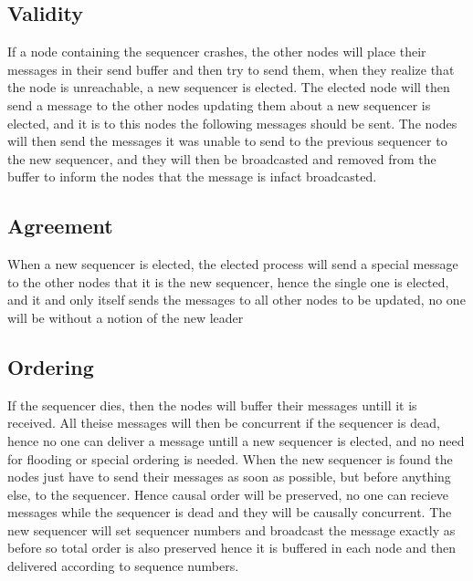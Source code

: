\documentclass{article}
\begin{document}
  \subsection{Validity}
    If a node containing the sequencer crashes, the other nodes will place their messages in their
    send buffer and then try to send them, when they realize that the node is unreachable, a new 
    sequencer is elected. The elected node will then send a message to the other nodes updating them
    about a new sequencer is elected, and it is to this nodes the following messages should be sent.
    The nodes will then send the messages it was unable to send to the previous sequencer to the
    new sequencer, and they will then be broadcasted and removed from the buffer to inform the nodes
    that the message is infact broadcasted.

  \subsection{Agreement}
    When a new sequencer is elected, the elected process will send a special message to the other nodes
    that it is the new sequencer, hence the single one is elected, and it and only itself sends the 
    messages to all other nodes to be updated, no one will be without a notion of the new leader

  \subsection{Ordering}
    If the sequencer dies, then the nodes will buffer their messages untill it is received. 
    All theise messages will then be concurrent if the sequencer is dead, hence no one can 
    deliver a message untill a new sequencer is elected, and no need for flooding or special
    ordering is needed. When the new sequencer is found the nodes just have to send their messages as soon
    as possible, but before anything else, to the sequencer. Hence causal order will be preserved, no one
    can recieve messages while the sequencer is dead and they will be causally concurrent. The new sequencer
    will set sequencer numbers and broadcast the message exactly as before so total order is also preserved
    hence it is buffered in each node and then delivered according to sequence numbers.
    
\end{document}
